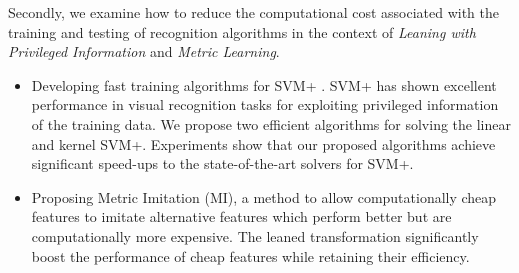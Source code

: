 Secondly, we examine how to reduce the computational cost associated with the training and testing of recognition algorithms in the context of \emph{Leaning with Privileged  Information} and \emph{Metric Learning}.   
\begin{itemize}
\item Developing fast training algorithms for SVM+ \citep{SVMplus_vapnik}.   SVM+ has shown excellent performance in visual recognition tasks for exploiting privileged information of the
  training data.   We propose two efficient algorithms
  for solving the linear and kernel SVM+. 
    Experiments show that our proposed algorithms achieve significant
  speed-ups to  the state-of-the-art solvers for  SVM+.
 

\item Proposing Metric Imitation (MI), a method to allow computationally cheap features to imitate alternative features which perform better but are computationally more expensive.   The leaned transformation significantly boost the performance of cheap features while retaining their efficiency.    
\end{itemize}

